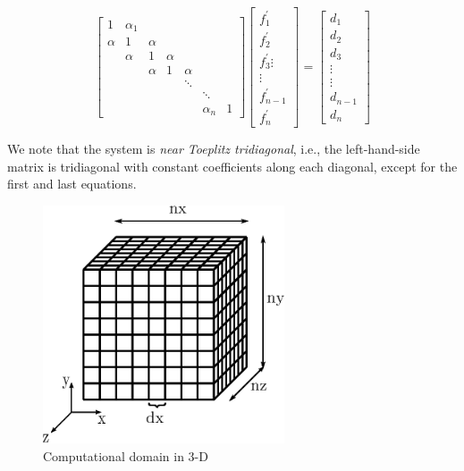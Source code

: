 \begin{equation} \label{eqn:compact-tridiagonal-system}
\begin{bmatrix}
     1 &  \alpha_1  \\
     \alpha   &  1   &  \alpha \\
         &  \alpha   &  1  &  \alpha  \\
         &      &  \alpha  &  1  &  \alpha  \\
         &      &     &     &  \ddots \\
         &      &     &     &     &  \ddots  \\
         &      &     &     &     &  \alpha_n &  1
\end{bmatrix}
\begin{bmatrix}
    f^{\prime}_1 \\
    f^{\prime}_2 \\
    f^{\prime}_3 
    \vdots \\
    \vdots \\
    f^{\prime}_{n-1} \\
    f^{\prime}_n
 \end{bmatrix}
=
\begin{bmatrix}
   d_1 \\
   d_2 \\
   d_3 \\
   \vdots \\
   \vdots \\
   d_{n-1} \\
   d_{n}
\end{bmatrix}
\end{equation}

We note that the system is \emph{near Toeplitz tridiagonal},
i.e., the left-hand-side matrix is tridiagonal with
constant coefficients along each diagonal,
except for the first and last equations.


\begin{figure}[h!]
\begin{center}
\includegraphics[height=200pt]{img/computational-domain.eps}
\end{center}
\caption{Computational domain in 3-D}
\label{fig:computational-domain}
\end{figure}

